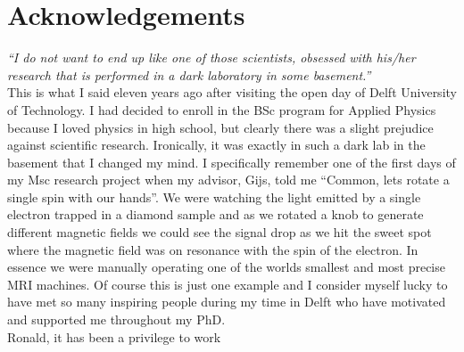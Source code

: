 \documentclass{report}
\begin{document}
\chapter{Acknowledgements}

\textit{``I do not want to end up like one of those scientists, obsessed with his/her research that is performed in a dark laboratory in some basement.''}
\\

This is what I said eleven years ago after visiting the open day of Delft University of Technology. I had decided to enroll in the BSc program for Applied Physics because I loved physics in high school, but clearly there was a slight prejudice against scientific research. Ironically, it was exactly in such a dark lab in the basement that I changed my mind. I specifically remember one of the first days of my Msc research project when my advisor, Gijs, told me  ``Common, lets rotate a single spin with our hands''. We were watching the light emitted by a single electron trapped in a diamond sample and as we rotated a knob to generate different magnetic fields we could see the signal drop as we hit the sweet spot where the magnetic field was on resonance with the spin of the electron. In essence we were manually operating one of the worlds smallest and most precise MRI machines.
Of course this is just one example and I consider myself lucky to have met so many inspiring people during my time in Delft who have motivated and supported me throughout my PhD.\\

Ronald, it has been a privilege to work
\end{document}
